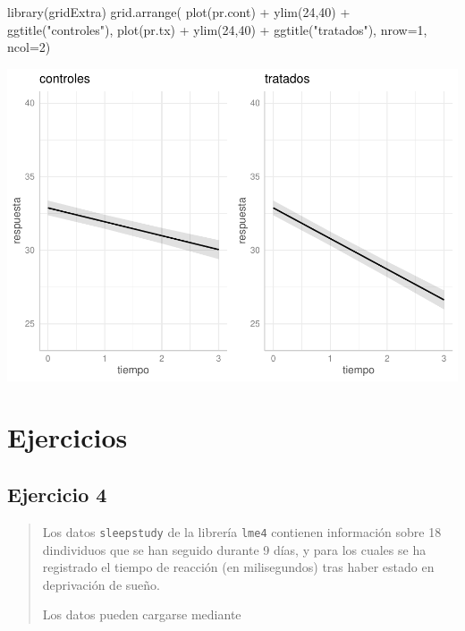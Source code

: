 \documentclass[
]{book}
\newenvironment{Shaded}{\begin{snugshade}}{\end{snugshade}}
\newcommand{\AttributeTok}[1]{\textcolor[rgb]{0.77,0.63,0.00}{#1}}
\newcommand{\DecValTok}[1]{\textcolor[rgb]{0.00,0.00,0.81}{#1}}
\newcommand{\FunctionTok}[1]{\textcolor[rgb]{0.00,0.00,0.00}{#1}}
\newcommand{\NormalTok}[1]{#1}
\newcommand{\SpecialCharTok}[1]{\textcolor[rgb]{0.00,0.00,0.00}{#1}}
\newcommand{\StringTok}[1]{\textcolor[rgb]{0.31,0.60,0.02}{#1}}
\begin{document}
\begin{Shaded}
\begin{Highlighting}[]
\FunctionTok{library}\NormalTok{(gridExtra)}
\FunctionTok{grid.arrange}\NormalTok{(}
    \FunctionTok{plot}\NormalTok{(pr.cont) }\SpecialCharTok{+} \FunctionTok{ylim}\NormalTok{(}\DecValTok{24}\NormalTok{,}\DecValTok{40}\NormalTok{) }\SpecialCharTok{+} \FunctionTok{ggtitle}\NormalTok{(}\StringTok{"controles"}\NormalTok{),}
    \FunctionTok{plot}\NormalTok{(pr.tx) }\SpecialCharTok{+} \FunctionTok{ylim}\NormalTok{(}\DecValTok{24}\NormalTok{,}\DecValTok{40}\NormalTok{) }\SpecialCharTok{+} \FunctionTok{ggtitle}\NormalTok{(}\StringTok{"tratados"}\NormalTok{),}
\AttributeTok{nrow=}\DecValTok{1}\NormalTok{, }\AttributeTok{ncol=}\DecValTok{2}\NormalTok{)}
\end{Highlighting}
\end{Shaded}

\includegraphics{fig_out/unnamed-chunk-143-1.pdf}

\hypertarget{ejercicios-1}{%
\section{Ejercicios}\label{ejercicios-1}}

\hypertarget{ejercicio-4}{%
\subsection{Ejercicio 4}\label{ejercicio-4}}

\begin{quote}
Los datos \texttt{sleepstudy} de la librería \texttt{lme4} contienen información sobre 18 dindividuos que se han seguido durante 9 días, y para los cuales se ha registrado el tiempo de reacción (en milisegundos) tras haber estado en deprivación de sueño.

Los datos pueden cargarse mediante
\end{quote}
\end{document}
